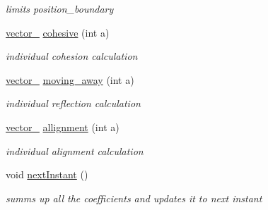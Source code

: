 \begin{DoxyCompactItemize}
\begin{DoxyCompactList}\small\item\em limits position\+\_\+boundary \end{DoxyCompactList}\item 
\mbox{\label{classflock_ac721457870dd50079eeb95d126057ed2}} 
\mbox{\hyperlink{classvector__3}{vector\+\_}} \mbox{\hyperlink{classflock_ac721457870dd50079eeb95d126057ed2}{cohesive}} (int a)
\begin{DoxyCompactList}\small\item\em individual cohesion calculation \end{DoxyCompactList}\item 
\mbox{\label{classflock_a5552e46786fc44709665b7661737eb81}} 
\mbox{\hyperlink{classvector__3}{vector\+\_}} \mbox{\hyperlink{classflock_a5552e46786fc44709665b7661737eb81}{moving\+\_\+away}} (int a)
\begin{DoxyCompactList}\small\item\em individual reflection calculation \end{DoxyCompactList}\item 
\mbox{\label{classflock_a9018d71c14f24ecdbfa244bff05ec884}} 
\mbox{\hyperlink{classvector__3}{vector\+\_}} \mbox{\hyperlink{classflock_a9018d71c14f24ecdbfa244bff05ec884}{allignment}} (int a)
\begin{DoxyCompactList}\small\item\em individual alignment calculation \end{DoxyCompactList}\item 
\mbox{\label{classflock_aeaf1b4e69875113e0d3bedc4296fa871}} 
void \mbox{\hyperlink{classflock_aeaf1b4e69875113e0d3bedc4296fa871}{next\+Instant}} ()
\begin{DoxyCompactList}\small\item\em summs up all the coefficients and updates it to next instant \end{DoxyCompactList}\end{DoxyCompactItemize}
